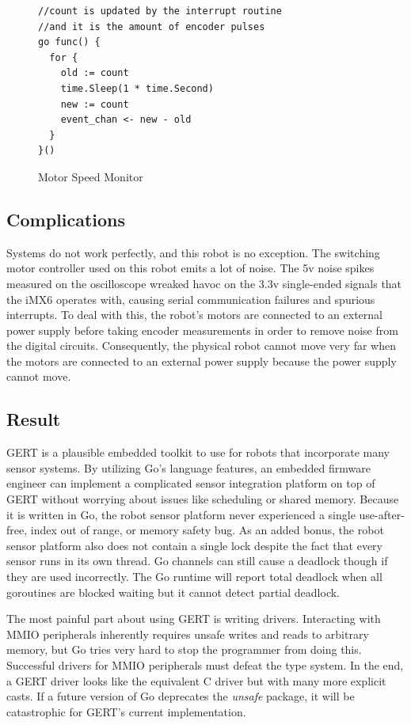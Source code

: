 \begin{figure}[h]
\begin{center}
\begin{lstlisting}
//count is updated by the interrupt routine
//and it is the amount of encoder pulses
go func() {
  for {
    old := count
    time.Sleep(1 * time.Second)
    new := count
    event_chan <- new - old
  }
}()
\end{lstlisting}
\end{center}
  \caption{Motor Speed Monitor} \label{fig:speedmon}
\end{figure}

\subsection{Complications}
Systems do not work perfectly, and this robot is no exception. The switching motor controller used
on this robot emits a lot of noise. The 5v noise spikes measured on the oscilloscope wreaked havoc
on the 3.3v single-ended signals that the iMX6 operates with, causing serial communication failures
and spurious interrupts. To deal with this, the robot's motors are connected to an external power supply before
taking encoder measurements in order to remove noise from the digital circuits. Consequently, the physical
robot cannot move very far when the motors are connected to an external power supply because the power supply cannot move.

\subsection{Result}
GERT is a plausible embedded toolkit to use for robots that incorporate many sensor systems.
By utilizing Go's language features, an embedded firmware engineer can implement a complicated sensor integration
platform on top of GERT without worrying about issues like scheduling or shared memory. Because it is written in Go,
the robot sensor platform
never experienced a single use-after-free, index out of range, or memory safety bug.
As an added bonus, the robot sensor platform also does not contain a single lock despite the fact that every sensor
runs in its own thread. Go channels can still cause a deadlock though if they are used incorrectly. The Go runtime
will report total deadlock when all goroutines are blocked waiting but it cannot detect partial deadlock.

The most painful part about using GERT is writing drivers. Interacting with MMIO
peripherals inherently requires unsafe writes and reads to arbitrary memory, but Go
tries very hard to stop the programmer from doing this. Successful drivers for MMIO
peripherals must defeat the type system. In the end, a GERT driver
looks like the equivalent C driver but with many more explicit casts.
If a future version of Go deprecates the \textit{unsafe} package, it will be catastrophic for
GERT's current implementation.



